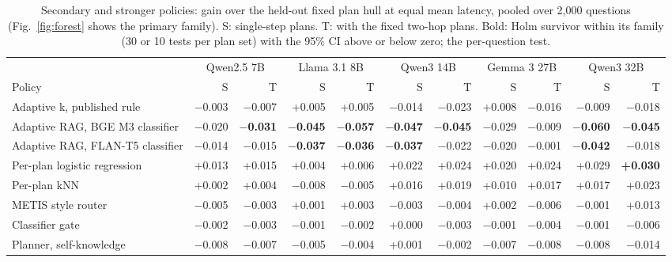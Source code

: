 \begin{table}[t]
\centering\footnotesize
\setlength{\tabcolsep}{4pt}
\caption{Secondary and stronger policies: gain over the held-out fixed plan hull at equal mean latency, pooled over 2,000 questions (Fig.~\ref{fig:forest} shows the primary family). S: single-step plans. T: with the fixed two-hop plans. Bold: Holm survivor within its family (30 or 10 tests per plan set) with the 95\% CI above or below zero; the per-question test.}
\label{tab:p_gains_rest}
\begin{tabular*}{\linewidth}{@{\extracolsep{\fill}}lrrrrrrrrrr@{}}
\toprule
 & \multicolumn{2}{c}{Qwen2.5 7B} & \multicolumn{2}{c}{Llama 3.1 8B} & \multicolumn{2}{c}{Qwen3 14B} & \multicolumn{2}{c}{Gemma 3 27B} & \multicolumn{2}{c}{Qwen3 32B} \\
\cmidrule(lr){2-3}\cmidrule(lr){4-5}\cmidrule(lr){6-7}\cmidrule(lr){8-9}\cmidrule(l){10-11}
Policy & S & T & S & T & S & T & S & T & S & T \\
\midrule
Adaptive k, published rule & $-$0.003 & $-$0.007 & +0.005 & +0.005 & $-$0.014 & $-$0.023 & +0.008 & $-$0.016 & $-$0.009 & $-$0.018 \\
Adaptive RAG, BGE M3 classifier & $-$0.020 & \textbf{$-$0.031} & \textbf{$-$0.045} & \textbf{$-$0.057} & \textbf{$-$0.047} & \textbf{$-$0.045} & $-$0.029 & $-$0.009 & \textbf{$-$0.060} & \textbf{$-$0.045} \\
Adaptive RAG, FLAN-T5 classifier & $-$0.014 & $-$0.015 & \textbf{$-$0.037} & \textbf{$-$0.036} & \textbf{$-$0.037} & $-$0.022 & $-$0.020 & $-$0.001 & \textbf{$-$0.042} & $-$0.018 \\
Per-plan logistic regression & +0.013 & +0.015 & +0.004 & +0.006 & +0.022 & +0.024 & +0.020 & +0.024 & +0.029 & \textbf{+0.030} \\
Per-plan kNN & +0.002 & +0.004 & $-$0.008 & $-$0.005 & +0.016 & +0.019 & +0.010 & +0.017 & +0.017 & +0.023 \\
METIS style router & $-$0.005 & $-$0.003 & +0.001 & +0.003 & $-$0.003 & $-$0.004 & +0.002 & $-$0.006 & $-$0.001 & +0.013 \\
\midrule
Classifier gate & $-$0.002 & $-$0.003 & $-$0.001 & $-$0.002 & +0.000 & $-$0.003 & $-$0.001 & $-$0.004 & $-$0.001 & $-$0.006 \\
Planner, self-knowledge & $-$0.008 & $-$0.007 & $-$0.005 & $-$0.004 & +0.001 & $-$0.002 & $-$0.007 & $-$0.008 & $-$0.008 & $-$0.014 \\
\bottomrule
\end{tabular*}
\end{table}
